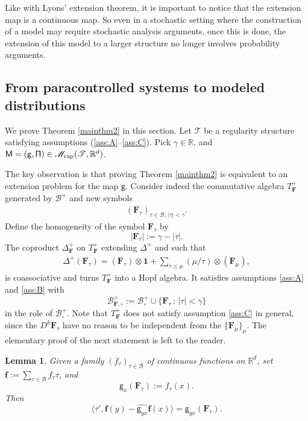 \documentclass[10pt]{amsart}
\theoremstyle{plain}
\newtheorem{lem}[thm]{Lemma}
\theoremstyle{definition}
\newcommand{\unit}{\mathbf{1}}
\newcommand{\bsf}{\boldsymbol{f}}
\newcommand{\rap}{\mathrm{rap}}
\newcommand{\sfg}{\mathsf{g}}
\newcommand{\bsF}{\boldsymbol{F}}
\newcommand{\scrM}{\mathscr{M}}
\newcommand{\scrT}{\mathscr{T}}
\newcommand{\bbR}{\mathbb{R}}
\newcommand{\mcB}{\mathcal{B}}
\begin{document}
Like with Lyons' extension theorem, it is important to notice that the extension map is a continuous map. So even in a stochastic setting where the construction of a model may require stochastic analysis arguments, once this is done, the extension of this model to a larger structure no longer involves probability arguments.

\subsection{From paracontrolled systems to modeled distributions}
\label{SubsectionPCtoModelledDistributions}

We prove Theorem \ref{mainthm2} in this section. Let $\scrT$ be a regularity structure satisfying assumptions (\ref{ass:A}--\ref{ass:C}). Pick $\gamma\in\bbR$, and ${\sf M = (g, \Pi)}\in\scrM_\rap(\scrT,\bbR^d)$.

The key observation is that proving Theorem \ref{mainthm2} is equivalent to an extension problem for the map $\sfg$. Consider indeed the commutative algebra $T_{\bsF}^+$ generated by $\mcB^+$ and new symbols
\begin{align*}
(\bsF_\tau)_{\tau\in\mcB,\, |\tau|<\gamma}.
\end{align*}
Define the homogeneity of the symbol $\bsF_\tau$ by
\[
|\bsF_\tau| := \gamma - |\tau|.
\]
The coproduct $\Delta^+_{\bsF}$ on $T_{\bsF}^+$ extending $\Delta^+$ and such that
\begin{align}\label{eq:def of Delta F/tau}
\Delta^+(\bsF_\tau) = (\bsF_\tau)\otimes\unit+\sum_{\tau\le\mu}(\mu/\tau)\otimes(\bsF_\mu),
\end{align}
is coassociative and turns $T^+_{\bsF}$ into a Hopf algebra. It satisfies assumptions \eqref{ass:A} and \eqref{ass:B} with
\[
\mcB^+_{{\bsF},\circ} := \mcB^+_\circ\cup\big\{{\bsF}_\tau\,;\,\vert\tau\vert<\gamma\big\}
\]
in the role of $\mcB^+_\circ$.
Note that $T_{\bsF}^+$ does not satisfy assumption \eqref{ass:C} in general, since the $D^k\bsF_\tau$ have no reason to be independent from the $\{\bsF_\mu\}_\mu$. The elementary proof of the next statement is left to the reader.

\begin{lem}\label{lem: model on Ftau is equiv to MD}
Given a family $(f_\tau)_{\tau\in\mcB}$ of continuous functions on $\bbR^d$, set $\bsf := \sum_{\tau\in\mcB}f_\tau\tau$, and
\[
\sfg_x(\bsF_\tau) := f_\tau(x) .
\]
Then
\[
\big\langle \tau', \bsf(y) - \widehat{\sfg_{yx}}\bsf(x)\big\rangle = \sfg_{yx}(\bsF_\tau).
\]
\end{lem}
\end{document}

